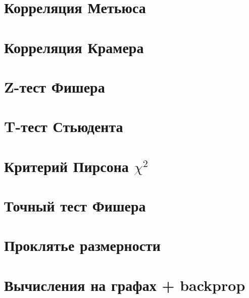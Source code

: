 \section{Корреляция Метьюса}


\section{Корреляция Крамера}


\section{Z-тест Фишера}


\section{T-тест Стьюдента}


\section{Критерий Пирсона $\chi^2$}


\section{Точный тест Фишера}


\section{Проклятье размерности}


\section{Вычисления на графах + backprop}


